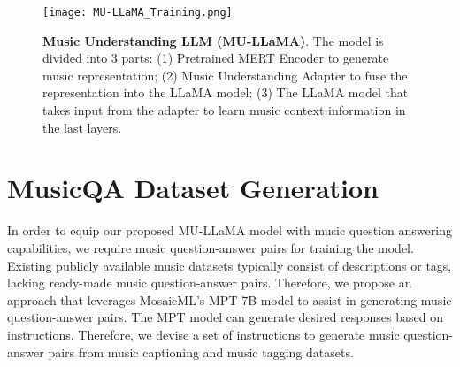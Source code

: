 \documentclass{article}
\begin{document}
\begin{figure*}
\centering
\texttt{[image: MU-LLaMA\_Training.png]}
\caption{\textbf{Music Understanding LLM (MU-LLaMA)}. The model is divided into 3 parts:
(1) Pretrained MERT Encoder to generate music representation;
(2) Music Understanding Adapter to fuse the representation into the LLaMA model;
(3) The LLaMA model that takes input from the adapter to learn music context information in the last  layers.}
\label{mu-llama}
\end{figure*}

\vspace{-0.2cm}
\section{MusicQA Dataset Generation}
\label{sec:musicqa}
\vspace{-0.2cm}

\noindent
In order to equip our proposed MU-LLaMA model with music question answering capabilities, we require music question-answer pairs for training the model. Existing publicly available music datasets typically consist of descriptions or tags, lacking ready-made music question-answer pairs. Therefore, we propose an approach that leverages MosaicML's MPT-7B model \cite{MosaicML2023Introducing} to assist in generating music question-answer pairs. The MPT model can generate desired responses based on instructions. Therefore, we devise a set of instructions to generate music question-answer pairs from music captioning and music tagging datasets.
\end{document}
